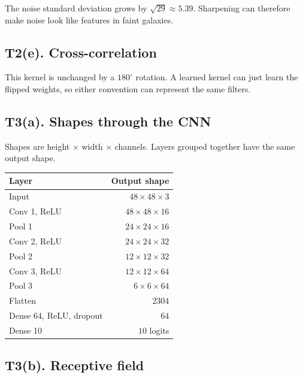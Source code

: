 \documentclass[11pt,a4paper]{article}
\begin{document}
The noise standard deviation grows by $\sqrt{29}\approx5.39$. Sharpening can therefore make noise look like features in faint galaxies.


\subsection*{T2(e). Cross-correlation}

This kernel is unchanged by a $180^\circ$ rotation. A learned kernel can just learn the flipped weights, so either convention can represent the same filters.


\subsection*{T3(a). Shapes through the CNN}

Shapes are height \(\times\) width \(\times\) channels. Layers grouped together have the same output shape.

{\normalsize\setlength{\tabcolsep}{4pt}
\begin{tabularx}{\linewidth}{|L|r|}
\hline
{}
\textbf{Layer} & \textbf{Output shape} \\ \hline
Input & $48\times48\times3$ \\ \hline
Conv 1, ReLU & $48\times48\times16$ \\ \hline
Pool 1 & $24\times24\times16$ \\ \hline
Conv 2, ReLU & $24\times24\times32$ \\ \hline
Pool 2 & $12\times12\times32$ \\ \hline
Conv 3, ReLU & $12\times12\times64$ \\ \hline
Pool 3 & $6\times6\times64$ \\ \hline
Flatten & $2304$ \\ \hline
Dense 64, ReLU, dropout & $64$ \\ \hline
Dense 10 & $10$ logits \\ \hline
\end{tabularx}\par}


\subsection*{T3(b). Receptive field}
\end{document}
